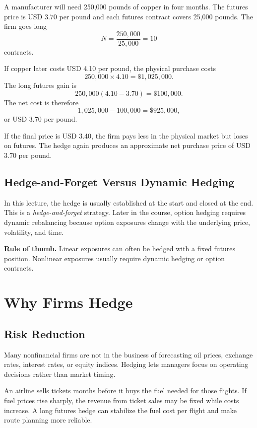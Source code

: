 \begin{exmp}
A manufacturer will need 250,000 pounds of copper in four months. The futures
price is USD 3.70 per pound and each futures contract covers 25,000 pounds. The
firm goes long
\[
    N=\frac{250{,}000}{25{,}000}=10
\]
contracts.

If copper later costs USD 4.10 per pound, the physical purchase costs
\[
    250{,}000\times 4.10=\$1{,}025{,}000.
\]
The long futures gain is
\[
    250{,}000(4.10-3.70)=\$100{,}000.
\]
The net cost is therefore
\[
    1{,}025{,}000-100{,}000=\$925{,}000,
\]
or USD 3.70 per pound.

If the final price is USD 3.40, the firm pays less in the physical market but
loses on futures. The hedge again produces an approximate net purchase price of
USD 3.70 per pound.
\end{exmp}

\subsection{Hedge-and-Forget Versus Dynamic Hedging}

In this lecture, the hedge is usually established at the start and closed at the
end. This is a \emph{hedge-and-forget} strategy. Later in the course, option
hedging requires dynamic rebalancing because option exposures change with the
underlying price, volatility, and time.

\begin{boxD}
\textbf{Rule of thumb.} Linear exposures can often be hedged with a fixed
futures position. Nonlinear exposures usually require dynamic hedging or option
contracts.
\end{boxD}

\section{Why Firms Hedge}

\subsection{Risk Reduction}

Many nonfinancial firms are not in the business of forecasting oil prices,
exchange rates, interest rates, or equity indices. Hedging lets managers focus on
operating decisions rather than market timing.

\begin{exmp}
An airline sells tickets months before it buys the fuel needed for those flights.
If fuel prices rise sharply, the revenue from ticket sales may be fixed while
costs increase. A long futures hedge can stabilize the fuel cost per flight and
make route planning more reliable.
\end{exmp}

